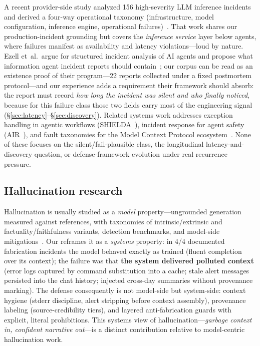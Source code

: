 A recent provider-side study analyzed 156 high-severity LLM inference
incidents and derived a four-way operational taxonomy (infrastructure,
model configuration, inference engine, operational
failures)~\cite{ranganathan2025inference}. That work shares our
production-incident grounding but covers the \emph{inference service}
layer below agents, where failures manifest as availability and latency
violations---loud by nature. Ezell et~al.\ argue for structured incident
analysis of AI agents and propose what information agent incident reports
should contain~\cite{ezell2025incident}; our corpus can be read as an
existence proof of their program---22 reports collected under a fixed
postmortem protocol---and our experience adds a requirement their
framework should absorb: the report must record \emph{how long the
incident was silent and who finally noticed}, because for this failure
class those two fields carry most of the engineering signal
(\S\ref{sec:latency}--\S\ref{sec:discovery}). Related systems work
addresses exception handling in agentic workflows
(SHIELDA~\cite{zhou2025shielda}), incident response for agent safety
(AIR~\cite{xiao2026air}), and fault taxonomies for the Model Context
Protocol ecosystem~\cite{taraghi2026mcp,owotogbe2026mcpruntime}. None of
these focuses on the silent/fail-plausible class, the longitudinal
latency-and-discovery question, or defense-framework evolution under real
recurrence pressure.

\subsection{Hallucination research}

Hallucination is usually studied as a \emph{model} property---ungrounded
generation measured against references, with taxonomies of
intrinsic/extrinsic and factuality/faithfulness variants, detection
benchmarks, and model-side mitigations~\cite{huang2023hallucination}. Our
 reframes it as a \emph{systems} property: in 4/4 documented
fabrication incidents the model behaved exactly as trained (fluent
completion over its context); the failure was that \textbf{the system
delivered polluted context} (error logs captured by command substitution
into a cache; stale alert messages persisted into the chat history;
injected cross-day summaries without provenance marking). The defense
consequently is not model-side but system-side: context hygiene (stderr
discipline, alert stripping before context assembly), provenance labeling
(source-credibility tiers), and layered anti-fabrication guards with
explicit, literal prohibitions. This systems view of
hallucination---\emph{garbage context in, confident narrative out}---is a
distinct contribution relative to model-centric hallucination work.

